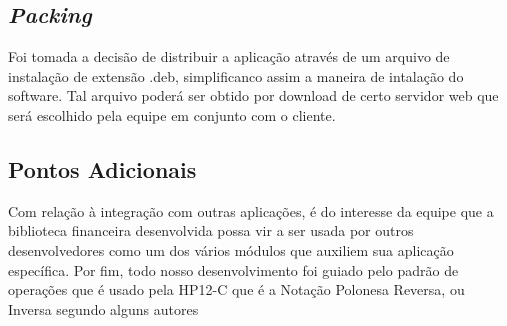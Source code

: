 \subsection{\textit{Packing}}
Foi tomada a decisão de distribuir a aplicação através de um arquivo de instalação de extensão .deb, simplificanco assim a maneira de intalação do software. Tal arquivo poderá ser obtido por download de certo servidor web que será escolhido pela equipe em conjunto com o cliente.

\subsection{Pontos Adicionais}
Com relação à integração com outras aplicações, é do interesse da equipe que a biblioteca financeira desenvolvida possa vir a ser usada por outros desenvolvedores como um dos vários módulos que auxiliem sua aplicação específica.
Por fim, todo nosso desenvolvimento foi guiado pelo padrão de operações que é usado pela HP12-C que é a Notação Polonesa Reversa, ou Inversa segundo alguns autores \cite{NPR}

